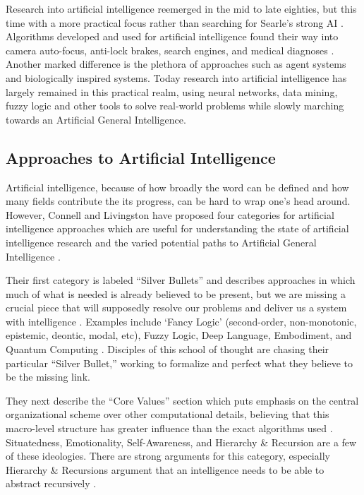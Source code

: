 \documentclass[fleqn,minimal]{article}
\begin{document}
	Research into artificial intelligence reemerged in the mid to late eighties, but this time with a more practical focus rather than searching for Searle's strong AI \cite{Jones}. Algorithms developed and used for artificial intelligence found their way into camera auto-focus, anti-lock brakes, search engines, and medical diagnoses \cite{Jones}. Another marked difference is the plethora of approaches such as agent systems and biologically inspired systems. Today research into artificial intelligence has largely remained in this practical realm, using neural networks, data mining, fuzzy logic and other tools to solve real-world problems while slowly marching towards an Artificial General Intelligence.
	
	\subsection{Approaches to Artificial Intelligence}
	
	Artificial intelligence, because of how broadly the word can be defined and how many fields contribute the its progress, can be hard to wrap one's head around. However, Connell and Livingston have proposed four categories for artificial intelligence approaches which are useful for understanding the state of artificial intelligence research and the varied potential paths to Artificial General Intelligence \cite{Connell}.
	
	Their first category is labeled ``Silver Bullets'' and describes approaches in which much of what is needed is already believed to be present, but we are missing a crucial piece that will supposedly resolve our problems and deliver us a system with intelligence \cite{Connell}. Examples include `Fancy Logic' (second-order, non-monotonic, epistemic, deontic, modal, etc), Fuzzy Logic, Deep Language, Embodiment, and Quantum Computing \cite{Connell}. Disciples of this school of thought are chasing their particular ``Silver Bullet,'' working to formalize and perfect what they believe to be the missing link.
	
	They next describe the ``Core Values'' section which puts emphasis on the central organizational scheme over other computational details, believing that this macro-level structure has greater influence than the exact algorithms used \cite{Connell}. Situatedness, Emotionality, Self-Awareness, and Hierarchy \& Recursion are a few of these ideologies. There are strong arguments for this category, especially Hierarchy \& Recursions argument that an intelligence needs to be able to abstract recursively \cite{Connell}.
	
\end{document}
